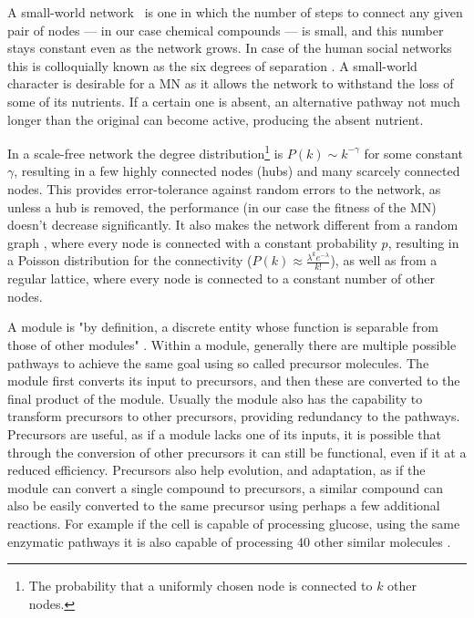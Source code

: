 \documentclass[a4paper,12pt]{article}
\begin{document}
	A small-world network \cite{smallworld}~is one in which the number of steps to connect any given pair of nodes --- in our case chemical compounds --- is small, and this number stays constant even as the network grows. In case of the human social networks this is colloquially known as the six degrees of separation \cite{sixdegrees}. A small-world character is desirable for a MN as it allows the network to withstand the loss of some of its nutrients. If a certain one is absent, an alternative pathway not much longer than the original can become active, producing the absent nutrient. %
	 
	In a scale-free network the degree distribution\footnote{The probability that a uniformly chosen node is connected to $k$ other nodes.} is $P(k)\sim k^{-\gamma}$ for some constant $\gamma$, resulting in a few highly connected nodes (hubs) and many scarcely connected nodes. This provides error-tolerance against random errors to the network, as unless a hub is removed, the performance (in our case the fitness of the MN) doesn't decrease significantly. It also makes the network different from a random graph \cite{randomgraphs}, where every node is connected with a constant probability $p$, resulting in a Poisson distribution for the connectivity ($P(k) \approx \frac{\lambda^k e^{-\lambda}}{k!} $), as well as from a regular lattice, where every node is connected to a constant number of other nodes.
	  
	A module is "by definition, a discrete entity whose function is separable from those of other modules" \cite{modulardef}. Within a module, generally there are multiple possible pathways to achieve the same goal using so called precursor molecules. The module first converts its input to precursors, and then these are converted to the final product of the module. Usually the module also has the capability to transform precursors to other precursors, providing redundancy to the pathways. Precursors are useful, as if a module lacks one of its inputs, it is possible that through the conversion of other precursors it can still be functional, even if it at a reduced efficiency. Precursors also help evolution, and adaptation, as if the module can convert a single compound to precursors, a similar compound can also be easily converted to the same precursor using perhaps a few additional reactions. For example if the cell is capable of processing glucose, using the same enzymatic pathways it is also capable of processing 40 other similar molecules \cite{latent}.
	
\end{document}
